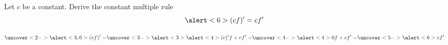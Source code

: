 \begin{frame}
\begin{example}
Let $c$ be a constant. Derive the constant multiple rule 
\[
\alert<6>{(cf)'=c f'}
\]
 

\[
\uncover<2->{\alert<3,6>{(cf)'}=} \uncover<3->{\alert<3>{\alert<4>{(c)'} f+ c f'}=}\uncover<4->{\alert<4>{0} f+cf'=}\uncover<5->{\alert<6>{cf'}}
\]
\end{example}

\end{frame}


